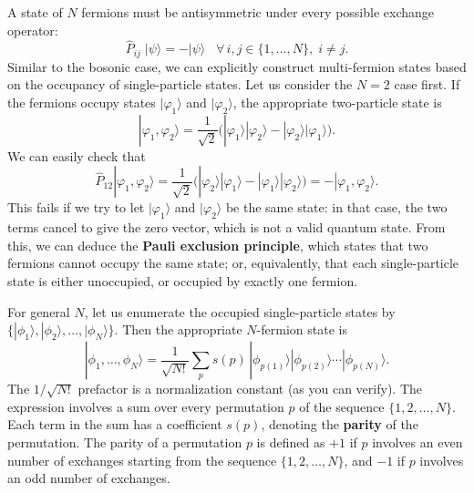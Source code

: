 \documentclass[pra,12pt]{revtex4}
\begin{document}
A state of $N$ fermions must be antisymmetric under every possible
exchange operator:
\begin{equation}
  \hat{P}_{ij}\; |\psi\rangle = -|\psi\rangle \;\;\; \forall\, i,j\in\{1,\dots,N\}, \; i\ne j.
\end{equation}
Similar to the bosonic case, we can explicitly construct multi-fermion
states based on the occupancy of single-particle states.  Let us
consider the $N=2$ case first.  If the fermions occupy states
$|\varphi_1\rangle$ and $|\varphi_2\rangle$, the appropriate two-particle
state is
\begin{equation}
  |\varphi_1,\varphi_2\rangle = \frac{1}{\sqrt{2}} \Big(|\varphi_1\rangle|\varphi_2\rangle - |\varphi_2\rangle|\varphi_1\rangle\Big).
\end{equation}
We can easily check that
\begin{equation}
  \hat{P}_{12} |\varphi_1,\varphi_2\rangle = \frac{1}{\sqrt{2}} \Big(|\varphi_2\rangle|\varphi_1\rangle - |\varphi_1\rangle|\varphi_2\rangle\Big) = - |\varphi_1,\varphi_2\rangle.
\end{equation}
This fails if we try to let $|\varphi_1\rangle$ and
$|\varphi_2\rangle$ be the same state: in that case, the two terms
cancel to give the zero vector, which is not a valid quantum state.
From this, we can deduce the \textbf{Pauli exclusion principle}, which
states that two fermions cannot occupy the same state; or,
equivalently, that each single-particle state is either unoccupied, or
occupied by exactly one fermion.

For general $N$, let us enumerate the occupied single-particle states
by $\{|\phi_1\rangle, |\phi_2\rangle,\dots,|\phi_N\rangle\}$.  Then
the appropriate $N$-fermion state is
\begin{equation}
  |\phi_1,\dots,\phi_N\rangle = \frac{1}{\sqrt{N!}} \sum_p s(p)\, |\phi_{p(1)}\rangle |\phi_{p(2)}\rangle \cdots |\phi_{p(N)}\rangle.
\end{equation}
The $1/\sqrt{N!}$ prefactor is a normalization constant (as you can
verify).  The expression involves a sum over every permutation $p$ of
the sequence $\{1,2,\dots,N\}$.  Each term in the sum has a
coefficient $s(p)$, denoting the \textbf{parity} of the permutation.
The parity of a permutation $p$ is defined as $+1$ if $p$ involves an
even number of exchanges starting from the sequence $\{1,2,\dots,N\}$,
and $-1$ if $p$ involves an odd number of exchanges.
\end{document}
